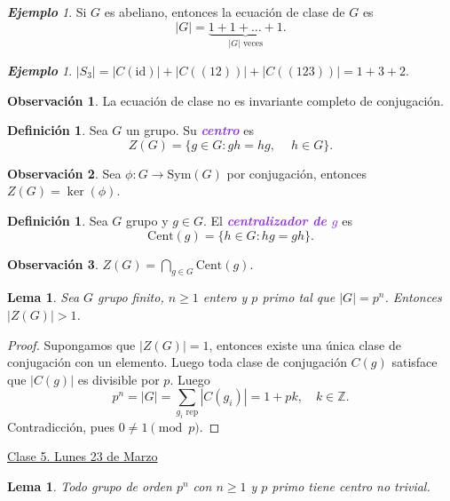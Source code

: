 \documentclass{article}
\newtheorem{lemma}[theorem]{Lema}
\theoremstyle{definition}
\newtheorem{definition}[theorem]{Definición}
\newtheorem*{obs}{Observación}
\theoremstyle{remark}
\newtheorem{example}[theorem]{\textbf{Ejemplo}}
\numberwithin{equation}{section}
\newcommand{\Z}{\mathbb{Z}}
\newcommand{\id}{\mathrm{id}}
\newcommand{\Sym}{\mathrm{Sym}}
\newcommand{\Cent}{\mathrm{Cent}}
\newcommand{\abs}[1]{\left| #1 \right|}
\newcommand{\ds}{\displaystyle}
\newcommand{\wea}[1]{\textcolor{BlueViolet}{\textbf{\emph{#1}}}}
\newcommand{\fecha}[1]{\begin{flushright} \underline{#1} \end{flushright}}
\begin{document}
\begin{example}
  Si $G$ es abeliano, entonces la ecuación de clase de $G$ es $$\abs G = \underbrace{1+1+\dots+1}_{\abs G \text{ veces}}.$$
\end{example}

\begin{example}
  $|S_3| = |C(\id)| + |C((12))| + |C((123))| = 1+3+2$.
\end{example}

\begin{obs}
  La ecuación de clase no es invariante completo de conjugación.
\end{obs}

\begin{definition}
  Sea $G$ un grupo. Su \wea{centro} es
  \[Z(G) = \{g \in G : gh=hg, \quad \ h \in G\}.\]
\end{definition}

\begin{obs}
  Sea $\phi \colon G \to \Sym(G)$ por conjugación, entonces $Z(G) = \ker(\phi)$. %
\end{obs}

\begin{definition}
  Sea $G$ grupo y $g \in G$. El \wea{centralizador de $g$} es
  \[\Cent(g) = \{h \in G : hg = gh\}.\]
\end{definition}

\begin{obs}
  $\ds Z(G) = \bigcap_{g \in G} \Cent(g)$.
\end{obs}

\newpage %
\begin{lemma}
  Sea $G$ grupo finito, $n\geq 1$ entero y $p$ primo tal que $\abs G = p^n$. Entonces $\abs{Z(G)} > 1$.
\end{lemma}
\begin{proof}
  Supongamos que $\abs{Z(G)}=1$, entonces existe una única clase de conjugación con un elemento. Luego toda clase de conjugación $C(g)$ satisface que $\abs{C(g)}$ es divisible por $p$. Luego
  \[p^n = \abs{G} = \sum_{g_i \text{ rep}} \abs{C(g_i)} = 1 +pk, \quad k \in \Z.\]
  Contradicción, pues $0 \neq 1 \pmod p$.
\end{proof}

\fecha{Clase 5. Lunes 23 de Marzo}

\begin{lemma}
  Todo grupo de orden $p^n$ con $n \geq 1$ y $p$ primo tiene centro no trivial.
\end{lemma}
\end{document}
